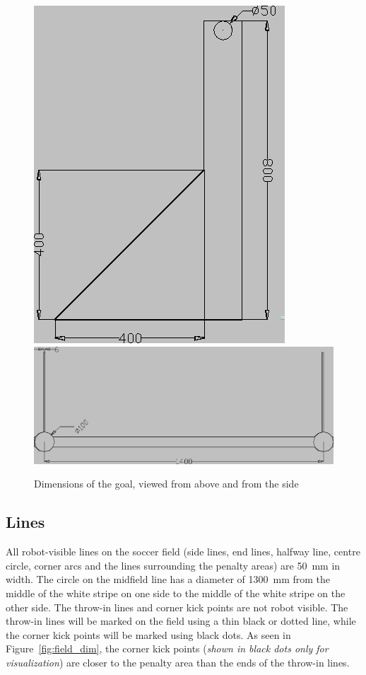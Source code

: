 \documentclass[12pt]{article}
\begin{document}




\begin{figure}[htp]
\begin{center}
    \leavevmode
    \includegraphics[width=0.4\columnwidth]{figs/goal_with_dims_left.png}\\
    \vspace{10pt}
    \includegraphics[width=0.8\columnwidth]{figs/goal_with_dims_top.png}
    \caption{Dimensions of the goal, viewed from above and from the side}
    \label{fig:goal_dimensions}
\end{center}
\end{figure}

\subsection{Lines}

All robot-visible lines on the soccer field (side lines, end
lines, halfway line, centre circle, corner arcs and the lines surrounding the
penalty areas) are 50~mm in width. The circle on the midfield line has a diameter of 1300~mm from the middle of the white stripe on one side to the middle of the white stripe on
the other side. The throw-in lines and corner kick points are not
robot visible. The throw-in lines will be marked on the field using a
thin black or dotted line, while the corner kick points will be marked
using black dots. As seen in Figure~\ref{fig:field_dim}, the corner
kick points (\emph{shown in black dots only for visualization}) are closer to
the penalty area than the ends of the throw-in lines.
\end{document}
